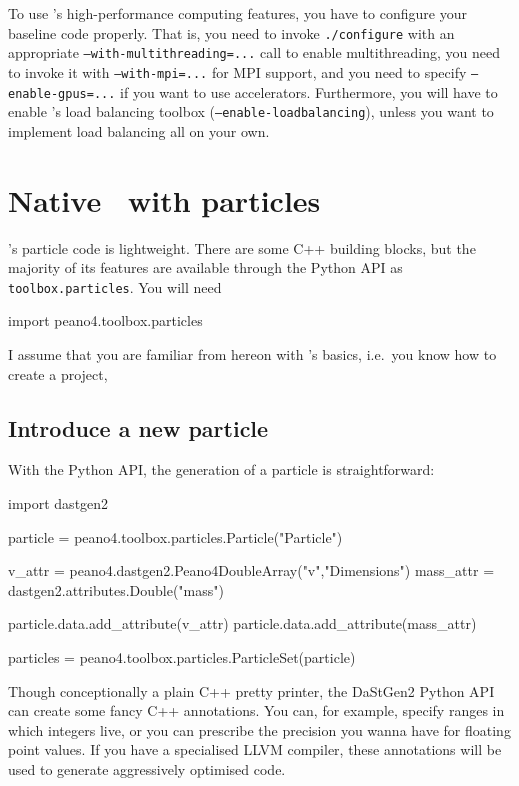 To use \Peano's high-performance computing features, you have to configure your
baseline code properly.
That is, you need to invoke \texttt{./configure} with an appropriate
\texttt{--with-multithreading=...} call to enable multithreading, 
you need to invoke it with \texttt{--with-mpi=...} for MPI support, and you need
to specify \texttt{--enable-gpus=...} if you want to use accelerators.
Furthermore, you will have to enable \Peano's load balancing toolbox
(\texttt{--enable-loadbalancing}), unless you want to implement load balancing all on
your own.



\section{Native \Peano\ with particles}

\Peano's particle code is lightweight.
There are some C++ building blocks, but the majority of its features are
available through the Python API as
\texttt{toolbox.particles}.
You will need

\begin{code}
import peano4.toolbox.particles
\end{code}

\noindent
I assume that you are familiar from hereon with \Peano's basics, i.e.~you know 
how to create a project, 

\subsection{Introduce a new particle}

With the Python API, the generation of a particle is straightforward:

\begin{code}
import dastgen2


particle = peano4.toolbox.particles.Particle("Particle")

v_attr = peano4.dastgen2.Peano4DoubleArray("v","Dimensions")
mass_attr = dastgen2.attributes.Double("mass")

particle.data.add_attribute(v_attr)
particle.data.add_attribute(mass_attr)

particles = peano4.toolbox.particles.ParticleSet(particle)
\end{code}

\begin{remark}
 Though conceptionally a plain C++ pretty printer, the DaStGen2 Python API
 can create some fancy C++ annotations. You can, for example, specify ranges
 in which integers live, or you can prescribe the precision you wanna have 
 for floating point values. If you have a specialised LLVM compiler, these
 annotations will be used to generate aggressively optimised code.
\end{remark}



